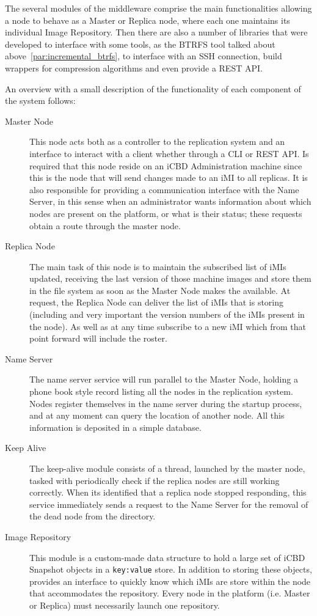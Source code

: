 The several modules of the middleware comprise the main functionalities allowing a node to behave as a Master or Replica node, where each one maintains its individual Image Repository. Then there are also a number of libraries that were developed to interface with some tools, as the BTRFS tool talked about above~\ref{par:incremental_btrfs}, to interface with an SSH connection, build wrappers for compression algorithms and even provide a REST API.

An overview with a small description of the functionality of each component of the system follows:

\begin{description}
	\item [Master Node] This node acts both as a controller to the replication system and an interface to interact with a client whether through a CLI or REST API. Is required that this node reside on an iCBD Administration machine since this is the node that will send changes made to an iMI to all replicas. It is also responsible for providing a communication interface with the Name Server, in this sense when an administrator wants information about which nodes are present on the platform, or what is their status; these requests obtain a route through the master node.
	\item [Replica Node] The main task of this node is to maintain the subscribed list of iMIs updated, receiving the last version of those machine images and store them in the file system as soon as the Master Node makes the available. At request, the Replica Node can deliver the list of iMIs that is storing (including and very important the version numbers of the iMIs present in the node). As well as at any time subscribe to a new iMI which from that point forward will include the roster.
	\item [Name Server] The name server service will run parallel to the Master Node, holding a phone book style record listing all the nodes in the replication system. Nodes register themselves in the name server during the startup process, and at any moment can query the location of another node. All this information is deposited in a simple database.
	\item [Keep Alive] The keep-alive module consists of a thread, launched by the master node, tasked with periodically check if the replica nodes are still working correctly. When its identified that a replica node stopped responding, this service immediately sends a request to the Name Server for the removal of the dead node from the directory.
	\item [Image Repository] This module is a custom-made data structure to hold a large set of iCBD Snapshot objects in a \texttt{key:value} store. In addition to storing these objects, provides an interface to quickly know which iMIs are store within the node that accommodates the repository. Every node in the platform (i.e. Master or Replica) must necessarily launch one repository.
\end{description}


